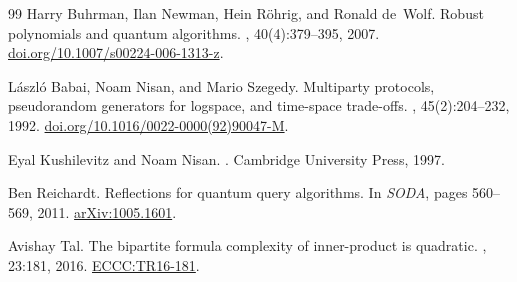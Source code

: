 \documentclass[10pt,a4paper]{article}
\begin{document}
\begin{thebibliography}{99}
Harry Buhrman, Ilan Newman, Hein R{\"{o}}hrig, and Ronald de~Wolf.
\newblock Robust polynomials and quantum algorithms.
, 40(4):379--395, 2007.
\newblock
  \href{https://doi.org/10.1007/s00224-006-1313-z}{doi.org/10.1007/s00224-006-1313-z}.

L{\'{a}}szl{\'{o}} Babai, Noam Nisan, and Mario Szegedy.
\newblock Multiparty protocols, pseudorandom generators for logspace, and
  time-space trade-offs.
, 45(2):204--232, 1992.
\newblock
  \href{https://doi.org/10.1016/0022-0000(92)90047-M}{doi.org/10.1016/0022-0000(92)90047-M}.

Eyal Kushilevitz and Noam Nisan.
.
\newblock Cambridge University Press, 1997.

Ben Reichardt.
\newblock Reflections for quantum query algorithms.
\newblock In {\em {SODA}}, pages 560--569, 2011.
\newblock \href{https://arxiv.org/abs/1005.1601}{arXiv:1005.1601}.

Avishay Tal.
\newblock The bipartite formula complexity of inner-product is quadratic.
,
  23:181, 2016.
\newblock \href{http://eccc.hpi-web.de/report/2016/181}{ECCC:TR16-181}.

\end{thebibliography}
\end{document}
